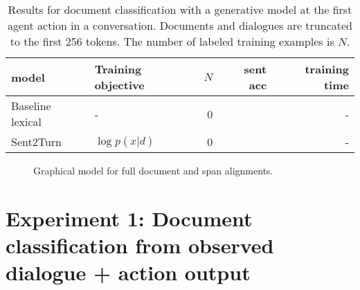 \documentclass[11pt]{article}
\begin{document}
\begin{table*}
\centering
\begin{tabular}{llrrr}
\toprule
model                             & Training objective     & $N$   & sent acc & training time\\
\midrule
Baseline lexical                  & -                      & 0     &    & -\\
Sent2Turn                         & $\log p(x|d)$          & 0     &    & -\\
\bottomrule
\end{tabular}
\caption{
\label{tbl:unsup-sent}
Results for document classification with a generative model at the first
agent action in a conversation. Documents and dialogues are truncated to the first 256
tokens.
The number of labeled training examples is $N$.}
\end{table*}

\begin{figure}[t]
\begin{center}
\end{center}
\caption{Graphical model for full document and span alignments.
}
\label{fig:pgm-doc-sent}
\end{figure}






\appendix

\section{Experiment 1: Document classification from observed dialogue + action output}
\end{document}
